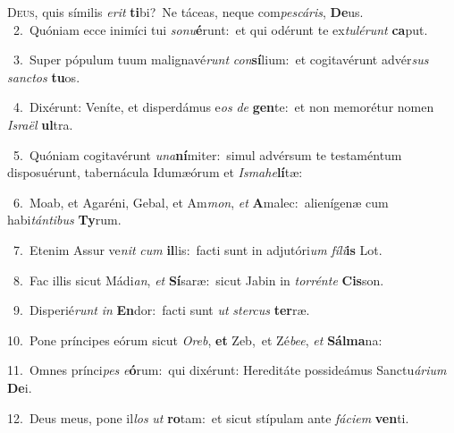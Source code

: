 \lettrine{\initial\textcolor{\initialcolor}{D}}{eus,} quis símilis \textit{e}\-\textit{rit} \textbf{ti}\-bi?~\star Ne táceas, neque com\-\textit{pes}\-\textit{cá}\textit{ris}, \textbf{De}\-us.\\
{\numbfont\textcolor{\numbcolor}{~2.}}~Quóniam ecce inimíci tui \textit{so}\-\textit{nu}\textbf{é}runt:~\star et qui odérunt te ex\-\textit{tu}\-\textit{lé}\textit{runt} \textbf{ca}\-put.\par
{\numbfont\textcolor{\numbcolor}{~3.}}~Super pópulum tuum malignavé\textit{runt} \textit{con}\-\textbf{sí}lium:~\star et cogitavérunt advér\textit{sus} \textit{sanc}\-\textit{tos} \textbf{tu}\-os.\par
{\numbfont\textcolor{\numbcolor}{~4.}}~Dixérunt: Veníte, et disperdámus e\textit{os} \textit{de} \textbf{gen}\-te:~\star et non memorétur nomen \textit{Is}\-\textit{ra}\textit{ël} \textbf{ul}\-tra.\par
{\numbfont\textcolor{\numbcolor}{~5.}}~Quóniam cogitavérunt \textit{u}\-\textit{na}\textbf{ní}miter:~\star simul advérsum te testaméntum disposuérunt, tabernácula Idumæórum et \textit{Is}\-\textit{ma}\textit{he}\textbf{lí}tæ:\par
{\numbfont\textcolor{\numbcolor}{~6.}}~Moab, et Agaréni, Gebal, et Am\-\textit{mon}\-, \textit{et} \textbf{A}\-malec:~\star alienígenæ cum habi\-\textit{tán}\-\textit{ti}\textit{bus} \textbf{Ty}\-rum.\par
{\numbfont\textcolor{\numbcolor}{~7.}}~Etenim Assur ve\textit{nit} \textit{cum} \textbf{il}\-lis:~\star facti sunt in adjutóri\textit{um} \textit{fí}\-\textit{li}\textbf{is} Lot.\par
{\numbfont\textcolor{\numbcolor}{~8.}}~Fac illis sicut Mádi\-\textit{an}\-, \textit{et} \textbf{Sí}\-saræ:~\star sicut Jabin in \textit{tor}\-\textit{rén}\textit{te} \textbf{Cis}\-son.\par
{\numbfont\textcolor{\numbcolor}{~9.}}~Disperié\textit{runt} \textit{in} \textbf{En}\-dor:~\star facti sunt \textit{ut} \textit{ster}\-\textit{cus} \textbf{ter}\-ræ.\par
{\numbfont\textcolor{\numbcolor}{10.}}~Pone príncipes eórum sicut \textit{O}\-\textit{reb}, \textbf{et} Zeb,~\star et Zé\-\textit{be}\-\textit{e}, \textit{et} \textbf{Sál}\-\textbf{ma}na:\par
{\numbfont\textcolor{\numbcolor}{11.}}~Omnes prínci\textit{pes} \textit{e}\-\textbf{ó}rum:~\star qui dixérunt: Hereditáte possideámus Sanctu\-\textit{á}\-\textit{ri}\textit{um} \textbf{De}\-i.\par
{\numbfont\textcolor{\numbcolor}{12.}}~Deus meus, pone il\textit{los} \textit{ut} \textbf{ro}\-tam:~\star et sicut stípulam ante \textit{fá}\-\textit{ci}\textit{em} \textbf{ven}\-ti.\par
